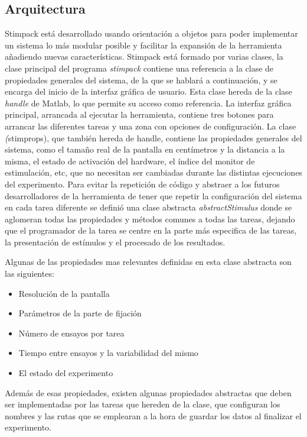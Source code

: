 \documentclass[conference]{IEEEtran}
\begin{document}
\subsection{Arquitectura}
Stimpack está desarrollado usando orientación a objetos para poder implementar un sistema lo más modular posible y facilitar la expansión de la herramienta añadiendo nuevas características.
Stimpack está formado por varias clases, la clase principal del programa \textit{stimpack} contiene una referencia a la clase de propiedades generales del sistema, de la que se hablará a continuación, y se encarga del inicio de la interfaz gráfica de usuario. Esta clase hereda de la clase \textit{handle} de Matlab, lo que permite su acceso como referencia. La interfaz gráfica principal, arrancada al ejecutar la herramienta, contiene tres botones para arrancar las diferentes tareas y una zona con opciones de configuración.
La clase \textit(stimprops), que también hereda de handle, contiene las propiedades generales del sistema, como el tamaño real de la pantalla en centímetros y la distancia a la misma, el estado de activación del hardware, el índice del monitor de estimulación, etc, que no necesitan ser cambiadas durante las distintas ejecuciones del experimento.
Para evitar la repetición de código y abstraer a los futuros desarrolladores de la herramienta de tener que repetir la configuración del sistema en cada tarea diferente se definió una clase abstracta \textit{abstractStimulus} donde se aglomeran todas las propiedades y métodos comunes a todas las tareas, dejando que el  programador de la tarea se centre en la parte más especifica de las tareas, la presentación de estímulos y el procesado de los resultados.

Algunas de las propiedades mas relevantes definidas en esta clase abstracta son las siguientes:

\begin{itemize}

	\item Resolución de la pantalla
	\item Parámetros de la parte de fijación
	\item Número de ensayos por tarea
	\item Tiempo entre ensayos y la variabilidad del mismo
	\item El estado del experimento

\end{itemize}

Además de esas propiedades, existen algunas propiedades abstractas que deben ser implementadas por las tareas que hereden de la clase, que configuran los nombres y las rutas que se emplearan a la hora de guardar los datos al finalizar el experimento.
\end{document}
